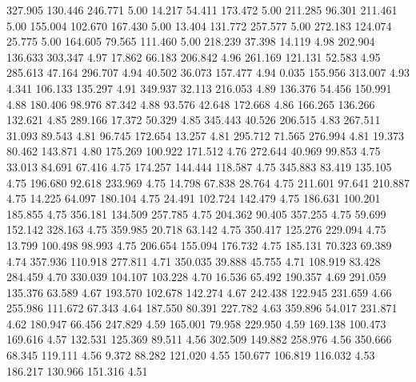  327.905  130.446  246.771         5.00
  14.217   54.411  173.472         5.00
 211.285   96.301  211.461         5.00
 155.004  102.670  167.430         5.00
  13.404  131.772  257.577         5.00
 272.183  124.074   25.775         5.00
 164.605   79.565  111.460         5.00
 218.239   37.398   14.119         4.98
 202.904  136.633  303.347         4.97
  17.862   66.183  206.842         4.96
 261.169  121.131   52.583         4.95
 285.613   47.164  296.707         4.94
  40.502   36.073  157.477         4.94
   0.035  155.956  313.007         4.93
   4.341  106.133  135.297         4.91
 349.937   32.113  216.053         4.89
 136.376   54.456  150.991         4.88
 180.406   98.976   87.342         4.88
  93.576   42.648  172.668         4.86
 166.265  136.266  132.621         4.85
 289.166   17.372   50.329         4.85
 345.443   40.526  206.515         4.83
 267.511   31.093   89.543         4.81
  96.745  172.654   13.257         4.81
 295.712   71.565  276.994         4.81
  19.373   80.462  143.871         4.80
 175.269  100.922  171.512         4.76
 272.644   40.969   99.853         4.75
  33.013   84.691   67.416         4.75
 174.257  144.444  118.587         4.75
 345.883   83.419  135.105         4.75
 196.680   92.618  233.969         4.75
  14.798   67.838   28.764         4.75
 211.601   97.641  210.887         4.75
  14.225   64.097  180.104         4.75
  24.491  102.724  142.479         4.75
 186.631  100.201  185.855         4.75
 356.181  134.509  257.785         4.75
 204.362   90.405  357.255         4.75
  59.699  152.142  328.163         4.75
 359.985   20.718   63.142         4.75
 350.417  125.276  229.094         4.75
  13.799  100.498   98.993         4.75
 206.654  155.094  176.732         4.75
 185.131   70.323   69.389         4.74
 357.936  110.918  277.811         4.71
 350.035   39.888   45.755         4.71
 108.919   83.428  284.459         4.70
 330.039  104.107  103.228         4.70
  16.536   65.492  190.357         4.69
 291.059  135.376   63.589         4.67
 193.570  102.678  142.274         4.67
 242.438  122.945  231.659         4.66
 255.986  111.672   67.343         4.64
 187.550   80.391  227.782         4.63
 359.896   54.017  231.871         4.62
 180.947   66.456  247.829         4.59
 165.001   79.958  229.950         4.59
 169.138  100.473  169.616         4.57
 132.531  125.369   89.511         4.56
 302.509  149.882  258.976         4.56
 350.666   68.345  119.111         4.56
   9.372   88.282  121.020         4.55
 150.677  106.819  116.032         4.53
 186.217  130.966  151.316         4.51
